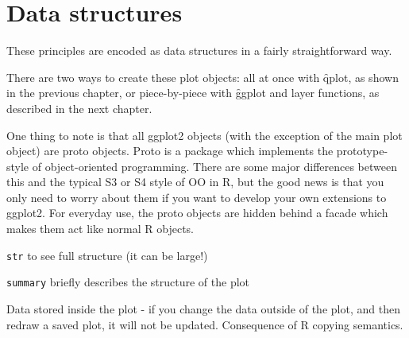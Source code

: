 \section{Data structures}
\label{sec:data_structures}

These principles are encoded as data structures in a fairly straightforward way.

There are two ways to create these plot objects: all at once with \f{qplot}, as shown in the previous chapter, or piece-by-piece with \f{ggplot} and layer functions, as described in the next chapter.

One thing to note is that all ggplot2 objects (with the exception of the main plot object) are proto objects.  Proto is a package which implements the prototype-style of object-oriented programming.  There are some major differences between this and the typical S3 or S4 style of OO in R, but the good news is that you only need to worry about them if you want to develop your own extensions to ggplot2.  For everyday use, the proto objects are hidden behind a facade which makes them act like normal R objects.

{\tt str} to see full structure (it can be large!)

{\tt summary} briefly describes the structure of the plot

Data stored inside the plot - if you change the data outside of the plot, and then redraw a saved plot, it will not be updated.  Consequence of R copying semantics.

